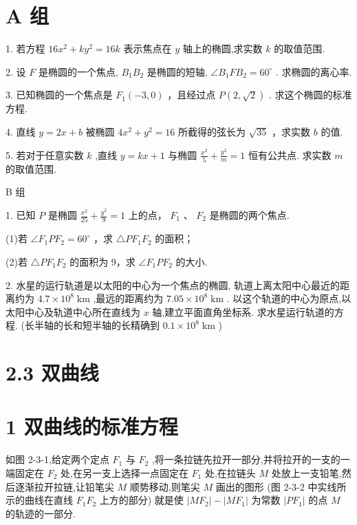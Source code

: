 \documentclass[10pt]{article}
\begin{document}
\section*{A 组}

1. 若方程 \({16}{x}^{2} + k{y}^{2} = {16k}\) 表示焦点在 \(y\) 轴上的椭圆,求实数 \(k\) 的取值范围.

2. 设 \(F\) 是椭圆的一个焦点, \({B}_{1}{B}_{2}\) 是椭圆的短轴, \(\angle {B}_{1}F{B}_{2} = {60}^{ \circ  }\) . 求椭圆的离心率.

3. 已知椭圆的一个焦点是 \({F}_{1}\left( {-3,0}\right)\) ，且经过点 \(P\left( {2,\sqrt{2}}\right)\) . 求这个椭圆的标准方程.

4. 直线 \(y = {2x} + b\) 被椭圆 \(4{x}^{2} + {y}^{2} = {16}\) 所截得的弦长为 \(\sqrt{35}\) ，求实数 \(b\) 的值.

5. 若对于任意实数 \(k\) ,直线 \(y = {kx} + 1\) 与椭圆 \(\frac{{x}^{2}}{5} + \frac{{y}^{2}}{m} = 1\) 恒有公共点. 求实数 \(m\) 的取值范围.

B 组

1. 已知 \(P\) 是椭圆 \(\frac{{x}^{2}}{25} + \frac{{y}^{2}}{9} = 1\) 上的点， \({F}_{1}\) 、 \({F}_{2}\) 是椭圆的两个焦点.

(1)若 \(\angle {F}_{1}P{F}_{2} = {60}^{ \circ  }\) ，求 \(\bigtriangleup P{F}_{1}{F}_{2}\) 的面积；

(2)若 \(\bigtriangleup P{F}_{1}{F}_{2}\) 的面积为 9，求 \(\angle {F}_{1}P{F}_{2}\) 的大小.

2. 水星的运行轨道是以太阳的中心为一个焦点的椭圆, 轨道上离太阳中心最近的距离约为 \({4.7} \times  {10}^{8}\mathrm{\;{km}}\) ,最远的距离约为 \({7.05} \times  {10}^{8}\mathrm{\;{km}}\) . 以这个轨道的中心为原点,以太阳中心及轨道中心所在直线为 \(x\) 轴,建立平面直角坐标系. 求水星运行轨道的方程. (长半轴的长和短半轴的长精确到 \({0.1} \times  {10}^{8}\mathrm{\;{km}}\) )

\section*{2.3 双曲线}

\section*{1 双曲线的标准方程}

如图 2-3-1,给定两个定点 \({F}_{1}\) 与 \({F}_{2}\) ,将一条拉链先拉开一部分,并将拉开的一支的一端固定在 \({F}_{2}\) 处,在另一支上选择一点固定在 \({F}_{1}\) 处,在拉链头 \(M\) 处放上一支铅笔,然后逐渐拉开拉链,让铅笔尖 \(M\) 顺势移动,则笔尖 \(M\) 画出的图形 (图 2-3-2 中实线所示的曲线在直线 \({F}_{1}{F}_{2}\) 上方的部分) 就是使 \(\left| {M{F}_{2}}\right|  - \left| {M{F}_{1}}\right|\) 为常数 \(\left| {P{F}_{1}}\right|\) 的点 \(M\) 的轨迹的一部分.
\end{document}
